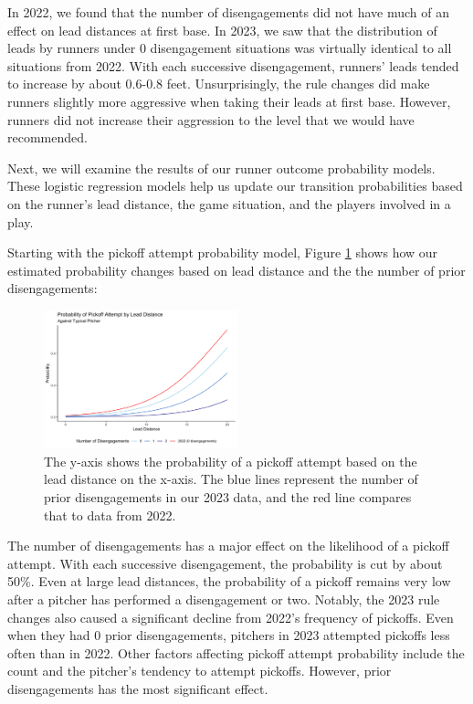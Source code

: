 \documentclass{article}
\begin{document}
    In 2022, we found that the number of disengagements did not have much of an  effect on lead distances at first base. In 2023, we saw that the distribution of leads by runners under 0 disengagement situations was virtually identical to all situations from 2022. With each successive disengagement, runners' leads tended to increase by about 0.6-0.8 feet. Unsurprisingly, the rule changes did make runners slightly more aggressive when taking their leads at first base. However, runners did not increase their aggression to the level that we would have recommended.
    
     Next, we will examine the results of our runner outcome probability models. These logistic regression models help us update our transition probabilities based on the runner's lead distance, the game situation, and the players involved in a play.
      
      
        Starting with the pickoff attempt probability model, Figure \ref{fig:prob-pickoff-attempt} shows how our estimated probability changes based on lead distance and the the number of prior disengagements:

        \begin{figure}
          \label{fig:prob-pickoff-attempt}
          \centering
          \includegraphics[width = 0.5\textwidth]{figures/prob_pickoff_attempt.png}
          \caption{The y-axis shows the probability of a pickoff attempt based on the lead distance on the x-axis. The blue lines represent the number of prior disengagements in our 2023 data, and the red line compares that to data from 2022.}
        \end{figure}

        The number of disengagements has a major effect on the likelihood of a pickoff attempt. With each successive disengagement, the probability is cut by about 50\%. Even at large lead distances, the probability of a pickoff remains very low after a pitcher has performed a disengagement or two. Notably, the 2023 rule changes also caused a significant decline from 2022's frequency of pickoffs. Even when they had 0 prior disengagements, pitchers in 2023 attempted pickoffs less often than in 2022. Other factors affecting pickoff attempt probability include the count and the pitcher's tendency to attempt pickoffs. However, prior disengagements has the most significant effect.
    
\end{document}

